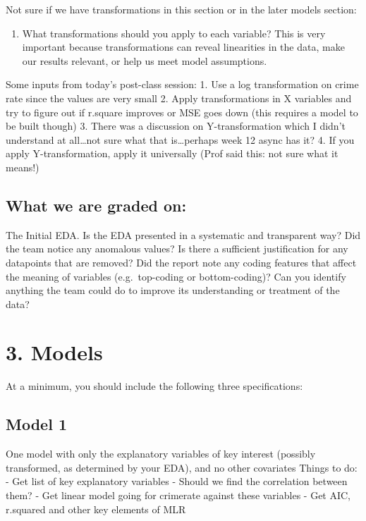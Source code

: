 \documentclass[]{article}
\providecommand{\tightlist}{%
  \setlength{\itemsep}{0pt}\setlength{\parskip}{0pt}}
\begin{document}
Not sure if we have transformations in this section or in the later
models section:

\begin{enumerate}
\def\labelenumi{\arabic{enumi}.}
\setcounter{enumi}{1}
\tightlist
\item
  What transformations should you apply to each variable? This is very
  important because transformations can reveal linearities in the data,
  make our results relevant, or help us meet model assumptions.
\end{enumerate}

Some inputs from today's post-class session: 1. Use a log transformation
on crime rate since the values are very small 2. Apply transformations
in X variables and try to figure out if r.square improves or MSE goes
down (this requires a model to be built though) 3. There was a
discussion on Y-transformation which I didn't understand at
all\ldots{}not sure what that is\ldots{}perhaps week 12 async has it? 4.
If you apply Y-transformation, apply it universally (Prof said this: not
sure what it means!)

\subsection{What we are graded on:}\label{what-we-are-graded-on-1}

The Initial EDA. Is the EDA presented in a systematic and transparent
way? Did the team notice any anomalous values? Is there a sufficient
justification for any datapoints that are removed? Did the report note
any coding features that affect the meaning of variables
(e.g.~top-coding or bottom-coding)? Can you identify anything the team
could do to improve its understanding or treatment of the data?

\section{3. Models}\label{models}

At a minimum, you should include the following three specifications:

\subsection{Model 1}\label{model-1}

One model with only the explanatory variables of key interest (possibly
transformed, as determined by your EDA), and no other covariates Things
to do: - Get list of key explanatory variables - Should we find the
correlation between them? - Get linear model going for crimerate against
these variables - Get AIC, r.squared and other key elements of MLR
\end{document}

